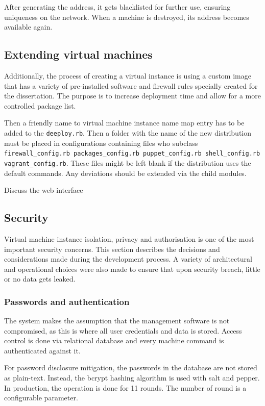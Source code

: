 \documentclass{article}
\begin{document}
After generating the address, it gets blacklisted for further use, ensuring uniqueness on the network. When a machine is destroyed, its address becomes available again.

\subsection{Extending virtual machines}
Additionally, the process of creating a virtual instance is using a custom image that has a variety of pre-installed software and firewall rules specially created for the dissertation. The purpose is to increase deployment time and allow for a more controlled package list.

Then a friendly name to virtual machine instance name map entry has to be added to the \texttt{deeploy.rb}. Then a folder with the name of the new distribution must be placed in configurations containing files who subclass \texttt{firewall\_config.rb packages\_config.rb puppet\_config.rb shell\_config.rb vagrant\_config.rb}. These files might be left blank if the distribution uses the default commands. Any deviations should be extended via the child modules.


{\color{red} 
Discuss the web interface
}

\subsection{Security}

Virtual machine instance isolation, privacy and authorisation is one of the most important security concerns. This section describes the decisions and considerations made during the development process. A variety of architectural and operational choices were also made to ensure that upon security breach, little or no data gets leaked.

\subsubsection{Passwords and authentication}
The system makes the assumption that the management software is not compromised, as this is where all user credentials and data is stored.
Access control is done via relational database and every machine command is authenticated against it. 

For password disclosure mitigation, the passwords in the database are not stored as plain-text. Instead, the bcrypt hashing algorithm is used with salt and pepper. In production, the operation is done for 11 rounds. The number of round is a configurable parameter.
\end{document}

